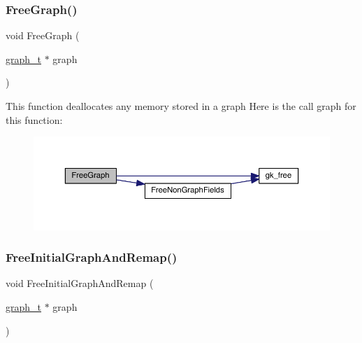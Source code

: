 \subsubsection{\texorpdfstring{Free\+Graph()}{FreeGraph()}}
{\footnotesize\ttfamily void Free\+Graph (\begin{DoxyParamCaption}\item[{\hyperlink{a00734}{graph\+\_\+t} $\ast$}]{graph }\end{DoxyParamCaption})}

This function deallocates any memory stored in a graph Here is the call graph for this function\+:\nopagebreak
\begin{figure}[H]
\begin{center}
\leavevmode
\includegraphics[width=350pt]{a00951_a583ba60fc42c1592f69587a1ae9c94d4_cgraph}
\end{center}
\end{figure}
\mbox{\label{a00951_a739360f530677f48f239c049cbbf7855}} 
\subsubsection{\texorpdfstring{Free\+Initial\+Graph\+And\+Remap()}{FreeInitialGraphAndRemap()}}
{\footnotesize\ttfamily void Free\+Initial\+Graph\+And\+Remap (\begin{DoxyParamCaption}\item[{\hyperlink{a00734}{graph\+\_\+t} $\ast$}]{graph }\end{DoxyParamCaption})}


